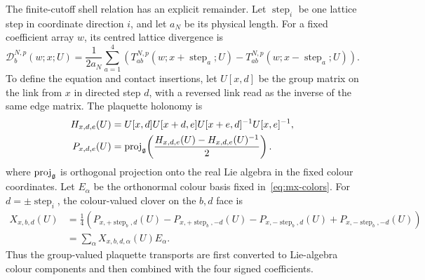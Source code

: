 The finite-cutoff shell relation has an explicit remainder. Let $\operatorname{step}_i$ be one lattice step in coordinate direction $i$, and let $a_N$ be its physical length. For a fixed coefficient array $w$, its centred lattice divergence is
\begin{equation*}
 \mathcal D_b^{N,p}(w;x;U)=\frac{1}{2a_N}\sum_{a=1}^4
 \left(T_{ab}^{N,p}(w;x+\operatorname{step}_a;U)-T_{ab}^{N,p}(w;x-\operatorname{step}_a;U)\right).
\end{equation*}
To define the equation and contact insertions, let $U[x,d]$ be the group matrix on the link from $x$ in directed step $d$, with a reversed link read as the inverse of the same edge matrix. The plaquette holonomy is
\begin{equation*}
\begin{aligned}
 H_{x,d,e}(U)&=U[x,d]U[x+d,e]U[x+e,d]^{-1}U[x,e]^{-1},\\
 P_{x,d,e}(U)&=\operatorname{proj}_{\mathfrak g}\!\left(\frac{H_{x,d,e}(U)-H_{x,d,e}(U)^{-1}}{2}\right).
\end{aligned}
\end{equation*}
where $\operatorname{proj}_{\mathfrak g}$ is orthogonal projection onto the real Lie algebra in the fixed colour coordinates. Let $E_\alpha$ be the orthonormal colour basis fixed in~\eqref{eq:mx-colors}. For $d=\pm\operatorname{step}_i$, the colour-valued clover on the $b,d$ face is
\begin{equation*}
\begin{aligned}
 X_{x,b,d}(U)&=\frac14\left(P_{x,+\operatorname{step}_b,d}(U)-P_{x,+\operatorname{step}_b,-d}(U)
 -P_{x,-\operatorname{step}_b,d}(U)+P_{x,-\operatorname{step}_b,-d}(U)\right)\\
 &=\sum_\alpha X_{x,b,d,\alpha}(U)E_\alpha.
\end{aligned}
\end{equation*}
Thus the group-valued plaquette transports are first converted to Lie-algebra colour components and then combined with the four signed coefficients.


